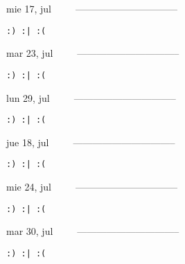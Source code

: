 \documentclass[letterpaper,10pt]{article}
\begin{document}
\begin{multicols}{3}
{mie 17, jul\ \ \ \ \ --------------------------------}
\begin{flushright}\begin{small}\texttt{:) :| :(}\end{small}\end{flushright}
\vfill
{mar 23, jul\ \ \ \ \ --------------------------------}
\begin{flushright}\begin{small}\texttt{:) :| :(}\end{small}\end{flushright}\par
\vfill
{lun 29, jul\ \ \ \ \ --------------------------------}
\begin{flushright}\begin{small}\texttt{:) :| :(}\end{small}\end{flushright}\par
\vfill
\end{multicols}
\vspace{1.05cm}

\begin{multicols}{3}
{jue 18, jul\ \ \ \ \ --------------------------------}
\begin{flushright}\begin{small}\texttt{:) :| :(}\end{small}\end{flushright}
\vfill
{mie 24, jul\ \ \ \ \ --------------------------------}
\begin{flushright}\begin{small}\texttt{:) :| :(}\end{small}\end{flushright}\par
\vfill
{mar 30, jul\ \ \ \ \ --------------------------------}
\begin{flushright}\begin{small}\texttt{:) :| :(}\end{small}\end{flushright}\par
\vfill
\end{multicols}
\vspace{1.05cm}
\end{document}
